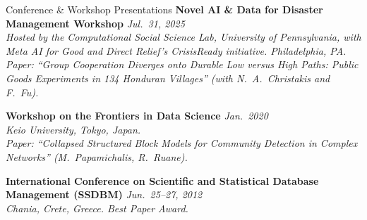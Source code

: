 \documentclass{resume}
\begin{document}
\begin{rSection}{Conference \& Workshop Presentations}
{\bf Novel AI \& Data for Disaster Management Workshop} \hfill {\em Jul.\ 31, 2025}\\
\textit{Hosted by the Computational Social Science Lab, University of Pennsylvania, with Meta AI for Good and Direct Relief's CrisisReady initiative. Philadelphia, PA.}\\
\hspace*{1em}\textit{Paper: ``Group Cooperation Diverges onto Durable Low versus High Paths: Public Goods Experiments in 134 Honduran Villages'' (with N.\ A.\ Christakis and F.\ Fu).}

{\bf Workshop on the Frontiers in Data Science} \hfill {\em Jan.\ 2020}\\
\textit{Keio University, Tokyo, Japan.}\\
\hspace*{1em}\textit{Paper: ``Collapsed Structured Block Models for Community Detection in Complex Networks'' (M.\ Papamichalis, R.\ Ruane).}

{\bf International Conference on Scientific and Statistical Database Management (SSDBM)} \hfill {\em Jun.\ 25--27, 2012}\\
\textit{Chania, Crete, Greece. Best Paper Award.}

\end{rSection}
\end{document}
